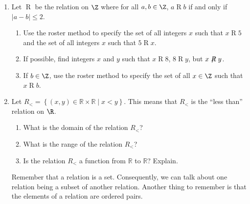 \begin{enumerate}
\item Let $\mathrel{R}$ be the relation on $\Z$ where for all $a, b \in \Z$, $a \mathrel{R} b$ if and only if $\left| a - b \right| \leq 2$. \label{exer:absvalueless2}

\begin{enumerate}
\yitem Use set builder notation to describe the relation $\mathrel{R}$ as a set of ordered pairs.

\yitem Determine the domain and range of the relation $\mathrel{R}$.

\item Use the roster method to specify the set of all integers $x$ such that $x \mathrel{R} 5$
and the set of all integers $x$ such that $5 \mathrel{R} x$.

\item If possible, find integers $x$ and $y$ such that $x \mathrel{R} 8$, $8 \mathrel{R} y$, but 
$x \mathrel{\not \negthickspace R} y$.

\item If $b \in \Z$, use the roster method to specify the set of all $x \in \Z$ such that 
$x \mathrel{R} b$.

\end{enumerate}

\item Let $R_{  < }  = \left\{ { {\left( {x, y} \right) \in \mathbb{R} \times \mathbb{R} } \mid x < y} \right\}$.  This means that $R_{  < } $ is the ``less than'' relation on  $\R$.
\label{exer:sec71-lessthan}%
\begin{enumerate}
  \item What is the domain of the relation  $R_{  < } $?  

  \item What is the range of the relation  $R_{  < } $?


  \item Is the relation  $R_{  < } $ a function from  $\mathbb{R}$ to  $\mathbb{R}$?  Explain.
\end{enumerate}


\noindent
\note  Remember that a relation is a set.  Consequently, we can talk about one relation being a subset of another relation.  Another thing to remember is that the elements of a relation are ordered pairs.

\end{enumerate}



